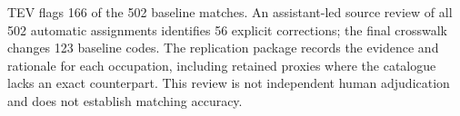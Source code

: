 TEV flags 166 of the 502 baseline matches. An assistant-led source review of all 502 automatic assignments identifies 56 explicit corrections; the final crosswalk changes 123 baseline codes. The replication package records the evidence and rationale for each occupation, including retained proxies where the catalogue lacks an exact counterpart. This review is not independent human adjudication and does not establish matching accuracy.
